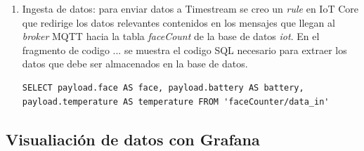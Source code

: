 \begin{enumerate}
	\item Ingesta de datos: para enviar datos a Timestream se creo un \textit{rule} en IoT Core que redirige los datos relevantes contenidos en los mensajes que llegan al \textit{broker} MQTT hacia la tabla \textit{faceCount} de la base de datos \textit{iot}. En el fragmento de codigo ... se muestra el codigo SQL necesario para extraer los datos que debe ser almacenados en la base de datos.
\begin{lstlisting}[label=cod:policie_json,caption=Codigo SQL del \textit{rule} para .]
SELECT payload.face AS face, payload.battery AS battery, payload.temperature AS temperature FROM 'faceCounter/data_in'
\end{lstlisting}	
	
\end{enumerate}

\subsection{Visualiación de datos con Grafana}




